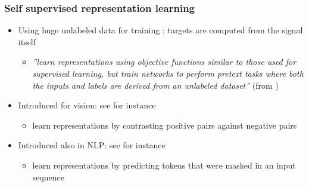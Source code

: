 \documentclass[table]{beamer}
\begin{document}
\frame{\tableofcontents[currentsection]}

\begin{frame}
\frametitle{Self supervised representation learning}
\begin{itemize}
	\item Using huge unlabeled data for training ; targets are computed from the signal itself
		\begin{itemize}
		\item \textit{''learn representations using objective functions similar to those used for supervised learning, but train networks to perform pretext tasks where both the inputs and labels are derived from an unlabeled dataset''} (from \cite{norouzi} )
		\end{itemize}
	\item Introduced for vision: see for instance  \citep{norouzi} 
	\begin{itemize}
		\item learn representations by contrasting positive pairs against negative pairs
	\end{itemize}
	\item Introduced also in NLP: see for instance \citep{bert}
	\begin{itemize}
		\item learn representations by predicting tokens that were masked in an input sequence
	\end{itemize}
\end{itemize}

\end{frame}
\end{document}
